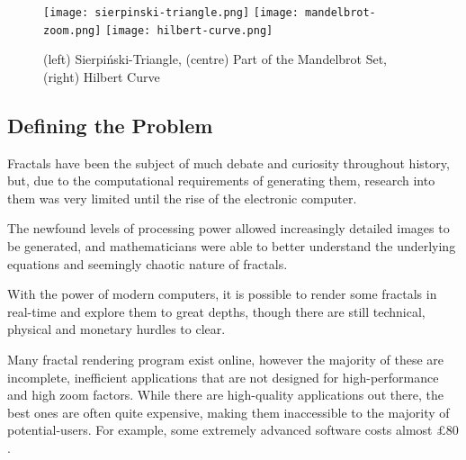 \begin{figure}[htp]
	\centering
	\texttt{[image: sierpinski-triangle.png]}\hfill
	\texttt{[image: mandelbrot-zoom.png]}\hfill
	\texttt{[image: hilbert-curve.png]}
	
	\caption{(left) Sierpiński-Triangle, (centre) Part of the Mandelbrot Set, (right) Hilbert Curve}
\end{figure}

\subsection{Defining the Problem}

Fractals have been the subject of much debate and curiosity throughout history, but, due to the computational requirements of generating them, research into them was very limited until the rise of the electronic computer.

The newfound levels of processing power allowed increasingly detailed images to be generated, and mathematicians were able to better understand the underlying equations and seemingly chaotic nature of fractals.

With the power of modern computers, it is possible to render some fractals in real-time and explore them to great depths, though there are still technical, physical and monetary hurdles to clear.

Many fractal rendering program exist online, however the majority of these are incomplete, inefficient applications that are not designed for high-performance and high zoom factors. While there are high-quality applications out there, the best ones are often quite expensive, making them inaccessible to the majority of potential-users. For example, some extremely advanced software costs almost \(\pounds 80\)\cite{slijkerman_2022}.

